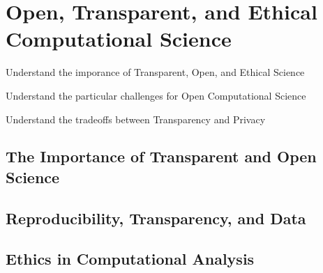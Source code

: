 \chapter{Open, Transparent, and Ethical Computational Science}


\begin{abstract}{Abstract}
  The use of Big Data and Computational Methods in Social Science has sparked a lively debate.
  In particular, proprietary data, privacy and copyright has 
\end{abstract}


\begin{objectives}
\item Understand the imporance of Transparent, Open, and Ethical Science
\item Understand the particular challenges for Open Computational Science
\item Understand the tradeoffs between Transparency and Privacy
\end{objectives}

\section{The Importance of Transparent and Open Science}

\section{Reproducibility, Transparency, and Data}

\section{Ethics in Computational Analysis}

  

